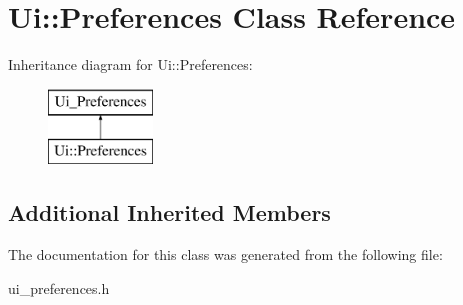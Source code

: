 \hypertarget{classUi_1_1Preferences}{\section{Ui\-:\-:Preferences Class Reference}
\label{classUi_1_1Preferences}
}
Inheritance diagram for Ui\-:\-:Preferences\-:\begin{figure}[H]
\begin{center}
\leavevmode
\includegraphics[height=2.000000cm]{classUi_1_1Preferences}
\end{center}
\end{figure}
\subsection*{Additional Inherited Members}


The documentation for this class was generated from the following file\-:\begin{DoxyCompactItemize}
\item 
ui\-\_\-preferences.\-h\end{DoxyCompactItemize}
